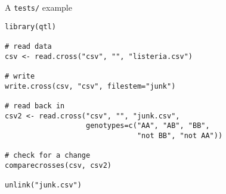 \documentclass[12pt,t]{beamer}
\begin{document}
\begin{frame}[c,fragile]{A {\tt tests/} example}

\begin{lstlisting}
library(qtl)

# read data
csv <- read.cross("csv", "", "listeria.csv")

# write
write.cross(csv, "csv", filestem="junk")

# read back in
csv2 <- read.cross("csv", "", "junk.csv",
                   genotypes=c("AA", "AB", "BB",
                               "not BB", "not AA"))

# check for a change
comparecrosses(csv, csv2)

unlink("junk.csv")
\end{lstlisting}

\end{frame}
\end{document}
